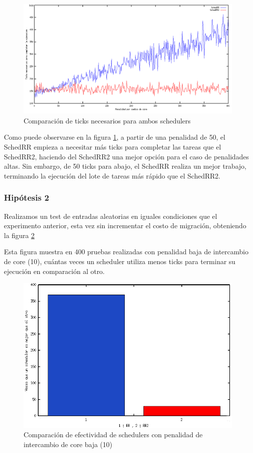 \documentclass[a4paper,10pt,twoside]{article}
\begin{document}
\begin{figure}[H]
\centering
\includegraphics[width=175mm]{../ejercicio8/compTicksSched.png}
\caption{Comparación de ticks necesarios para ambos schedulers}
\label{compTicksSched}
\end{figure}

Como puede observarse en la figura \ref{compTicksSched}, a partir de una penalidad de 50, el SchedRR empieza a necesitar más ticks para completar las tareas que el SchedRR2, haciendo del SchedRR2 una mejor opción para el caso de penalidades altas. Sin embargo, de 50 ticks para abajo, el SchedRR realiza un mejor trabajo, terminando la ejecución del lote de tareas más rápido que el SchedRR2.

\subsubsection{Hipótesis 2}

Realizamos un test de entradas aleatorias en iguales condiciones que el experimento anterior, esta vez sin incrementar el costo de migración, obteniendo la figura \ref{RRvsRR2}

Esta figura muestra en 400 pruebas realizadas con penalidad baja de intercambio de core (10), cuántas veces un scheduler utiliza menos ticks para terminar su ejecución en comparación al otro.

\begin{figure}[H]
\centering
\includegraphics[width=150mm]{../ejercicio8/RRvsRR2.png}
\caption{Comparación de efectividad de schedulers con penalidad de intercambio de core baja (10)}
\label{RRvsRR2}
\end{figure}
\end{document}
